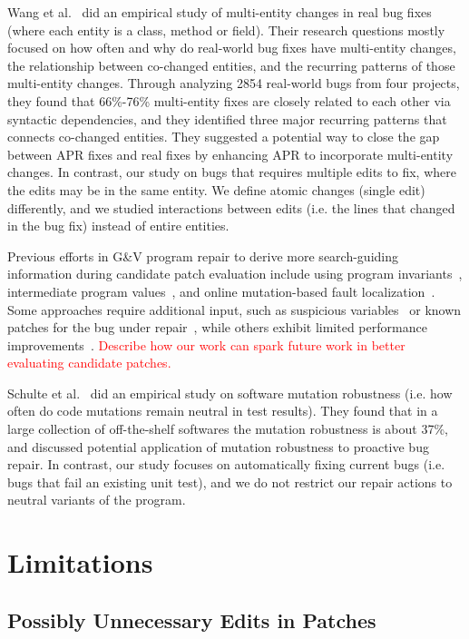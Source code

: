 \documentclass[sigconf, timestamp-false, anonymous=true]{acmart}
\newcommand\todo[1]{\textcolor{red}{#1}}
\begin{document}
Wang et al.~\cite{wang2018} did an empirical study of multi-entity changes in real bug fixes 
(where each entity is a class, method or field). Their research questions mostly focused on 
how often and why do real-world bug fixes have multi-entity changes, the relationship 
between co-changed entities, and the recurring patterns of those multi-entity changes. 
Through analyzing 2854 real-world bugs from four projects, they found that 66\%-76\% 
multi-entity fixes are closely related to each other via syntactic dependencies, 
and they identified three major recurring patterns that connects co-changed entities. 
They suggested a potential way to close the gap between APR fixes and real fixes by 
enhancing APR to incorporate multi-entity changes. In contrast, our study on bugs that
requires multiple edits to fix, where the edits may be in the same entity. We define atomic 
changes (single edit) differently, and we studied interactions between edits 
(i.e. the lines that changed in the bug fix) instead of entire entities.

Previous efforts in G\&V program repair to derive more search-guiding information 
during candidate patch evaluation 
include using program invariants~\cite{better-fitness, dinglyu}, 
intermediate program values~\cite{source-code-checkpoint}, 
and online mutation-based fault localization~\cite{mut-analysis}.
Some approaches require additional input, such as suspicious variables~\cite{source-code-checkpoint} 
or known patches for the bug under repair~\cite{better-fitness}, 
while others exhibit limited performance improvements~\cite{dinglyu, mut-analysis}.
\todo{Describe how our work can spark future work in better evaluating candidate patches.}

Schulte et al.~\cite{schulte} did an empirical study on software mutation robustness 
(i.e. how often do code mutations remain neutral in test results). 
They found that in a large collection of off-the-shelf softwares the mutation robustness is about 37\%, 
and discussed potential application of mutation robustness to proactive bug repair. 
In contrast, our study focuses on automatically fixing current bugs (i.e. bugs that fail an existing unit test), 
and we do not restrict our repair actions to neutral variants of the program.

\section{Limitations}

\subsection{Possibly Unnecessary Edits in Patches}
\end{document}
